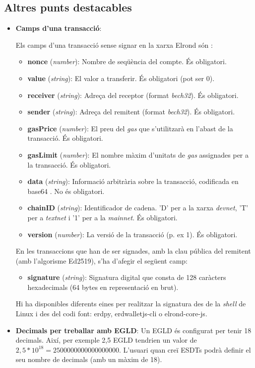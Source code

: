 \documentclass[11pt,a4paper]{article}
\begin{document}
\subsection{Altres punts destacables}\label{sub:altres}
\begin{itemize}
\item \textbf{Camps d'una transacció}:

Els camps d'una transacció sense signar en la xarxa Elrond són \cite{elrond2022}:
\begin{itemize}
\item \textbf{nonce} (\textit{number}): Nombre de seqüència del compte. És obligatori.
\item \textbf{value}	(\textit{string}): El valor a transferir. És obligatori (pot ser 0).
\item \textbf{receiver} (\textit{string}): Adreça del receptor (format \textit{bech32}). És obligatori.
\item \textbf{sender} (\textit{string}): Adreça del remitent (format \textit{bech32}). És obligatori.
\item \textbf{gasPrice} (\textit{number}): El preu del \textit{gas} que s'utilitzarà en l'abast de la transacció. És obligatori.
\item \textbf{gasLimit} (\textit{number}): El nombre màxim d'unitats de \textit{gas} assignades per a la transacció. És obligatori.
\item \textbf{data} (\textit{string}): Informació arbitrària sobre la transacció, codificada en base64 . No és obligatori.
\item \textbf{chainID} (\textit{string}): Identificador de cadena. 'D' per a la xarxa \textit{devnet}, 'T' per a \textit{textnet} i '1' per a la \textit{mainnet}. És obligatori.
\item \textbf{version} (\textit{number}): La versió de la transacció (p. ex 1). És obligatori.
\end{itemize}
En les transaccions que han de ser signades, amb la clau pública del remitent (amb l'algorisme Ed2519), s'ha d'afegir el següent camp: 
\begin{itemize}
\item \textbf{signature} (\textit{string}): Signatura digital que consta de 128 caràcters hexadecimals (64 bytes en representació en brut).
\end{itemize}
Hi ha disponibles diferents eines per realitzar la signatura des de la \textit{shell} de Linux i des del codi font: erdpy, erdwalletjs-cli o elrond-core-js.
\item \textbf{Decimals per treballar amb EGLD}: Un EGLD és configurat per tenir 18 decimals. Així, per exemple 2,5 EGLD tendrien un valor de \(2,5 * 10^{18} = 2500000000000000000\). L'usuari quan creï ESDTs podrà definir el seu nombre de decimals (amb un màxim de 18).

\end{itemize}
\end{document}
